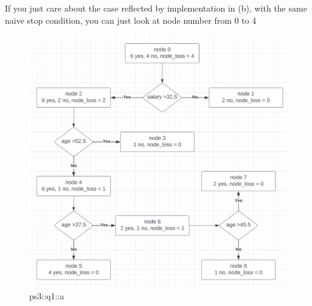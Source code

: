 \begin{answer}

If you just care about the case reflected by implementation in (b), with the same naive stop condition, you can just look at node number from 0 to 4 
\begin{figure}[H]
    \centering
    \includegraphics[width=0.5\linewidth]{Screenshot 2024-02-20 at 21.17.01.png}
    \caption{ps3::q1::a}
    \label{fig:enter-label}
\end{figure}
\end{answer}